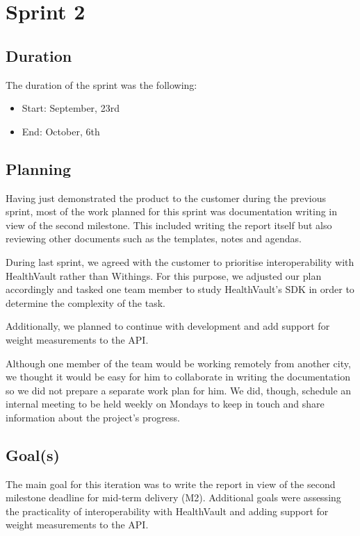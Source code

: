 
\chapter{Sprint 2}
\label{Sprint2}

\section{Duration}
The duration of the sprint was the following:
\begin{itemize}
\item Start: September, 23rd
\item End: October, 6th
\end{itemize}

\section{Planning}

Having just demonstrated the product to the customer during the previous sprint, 
most of the work planned for this sprint was documentation writing in view of the second milestone.
This included writing the report itself but also reviewing other documents such as the
templates, notes and agendas.

During last sprint, we agreed with the customer to prioritise interoperability with
HealthVault rather than Withings.
For this purpose, we adjusted our plan accordingly and tasked one team member
to study HealthVault's SDK in order to determine the complexity of the task.

Additionally, we planned to continue with development and add support for weight
measurements to the API.

Although one member of the team would be working remotely from another city,
we thought it would be easy for him to collaborate in writing the documentation
so we did not prepare a separate work plan for him.
We did, though, schedule an internal meeting to be held weekly on Mondays
to keep in touch and share information about the project's progress.


\section{Goal(s)}

The main goal for this iteration was to write the report in view of the second milestone deadline
for mid-term delivery (M2). Additional goals were assessing the practicality of interoperability
with HealthVault and adding support for weight measurements to the API.



